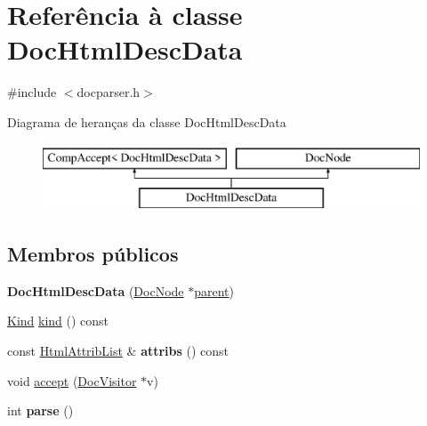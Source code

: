 \hypertarget{class_doc_html_desc_data}{\section{Referência à classe Doc\-Html\-Desc\-Data}
\label{class_doc_html_desc_data}
}


{\ttfamily \#include $<$docparser.\-h$>$}

Diagrama de heranças da classe Doc\-Html\-Desc\-Data\begin{figure}[H]
\begin{center}
\leavevmode
\includegraphics[height=2.000000cm]{class_doc_html_desc_data}
\end{center}
\end{figure}
\subsection*{Membros públicos}
\begin{DoxyCompactItemize}
\item 
\hypertarget{class_doc_html_desc_data_acdea9f257d291976325841af3f3edcf1}{{\bfseries Doc\-Html\-Desc\-Data} (\hyperlink{class_doc_node}{Doc\-Node} $\ast$\hyperlink{class_doc_node_abd7f070d6b0a38b4da71c2806578d19d}{parent})}\label{class_doc_html_desc_data_acdea9f257d291976325841af3f3edcf1}

\item 
\hyperlink{class_doc_node_aa10c9e8951b8ccf714a59ec321bdac5b}{Kind} \hyperlink{class_doc_html_desc_data_aa9d037bed9f9a083d0cd01485637d843}{kind} () const 
\item 
\hypertarget{class_doc_html_desc_data_aae3c838ea3d3273b35d07e9965a8985e}{const \hyperlink{class_html_attrib_list}{Html\-Attrib\-List} \& {\bfseries attribs} () const }\label{class_doc_html_desc_data_aae3c838ea3d3273b35d07e9965a8985e}

\item 
void \hyperlink{class_doc_html_desc_data_a7ba716e854ae2f8f87a4eb2140e302b6}{accept} (\hyperlink{class_doc_visitor}{Doc\-Visitor} $\ast$v)
\item 
\hypertarget{class_doc_html_desc_data_a67007fc2be130666fbf3b065022756f4}{int {\bfseries parse} ()}\label{class_doc_html_desc_data_a67007fc2be130666fbf3b065022756f4}

\end{DoxyCompactItemize}

